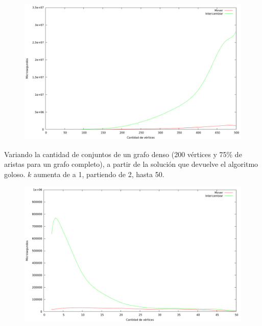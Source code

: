 \begin{figure}[H]
  \begin{center}
    \includegraphics[scale=0.35]{imagenes/local-random-n-tiempo.png}
  \end{center}
\end{figure}

\vspace*{0.35cm}

Variando la cantidad de conjuntos de un grafo denso (200 vértices y 75\% de
aristas para un grafo completo), a partir de la solución que devuelve el
algoritmo goloso. $k$ aumenta de a 1, partiendo de 2, hasta 50.

\vspace*{0.5cm}

\begin{figure}[H]
  \begin{center}
    \includegraphics[scale=0.35]{imagenes/local-goloso-k-tiempo.png}
  \end{center}
\end{figure}

